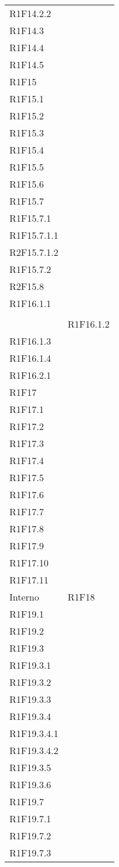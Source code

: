\begin{longtable}{ >{\centering}p{}
			>{\centering}p{}}
	R1F14.2.2\\ 
	R1F14.3\\ 
	R1F14.4\\ 
	R1F14.5\\ 
	R1F15\\ 
	R1F15.1\\ 
	R1F15.2\\ 
	R1F15.3\\ 
	R1F15.4\\ 
	R1F15.5\\ 
	R1F15.6\\ 
	R1F15.7\\ 
	R1F15.7.1\\ 
	R1F15.7.1.1\\ 
	R2F15.7.1.2\\ 
	R1F15.7.2\\ 
	R2F15.8\\ 
	R1F16.1.1 \tabularnewline \rowcolordark &
	\tabularnewline & 
	R1F16.1.2\\
	R1F16.1.3\\ 
	R1F16.1.4\\ 
	R1F16.2.1\\ 
	R1F17\\ 
	R1F17.1\\ 
	R1F17.2\\ 
	R1F17.3\\ 
	R1F17.4\\ 
	R1F17.5\\ 
	R1F17.6\\ 
	R1F17.7\\ 
	R1F17.8\\ 
	R1F17.9\\ 
	R1F17.10\\ 
	R1F17.11 \tabularnewline
	Interno	&	
	R1F18\\ 
	R1F19.1\\ 
	R1F19.2\\ 
	R1F19.3\\ 
	R1F19.3.1\\ 
	R1F19.3.2\\ 
	R1F19.3.3\\ 
	R1F19.3.4\\ 
	R1F19.3.4.1\\ 
	R1F19.3.4.2\\ 
	R1F19.3.5\\ 
	R1F19.3.6\\ 
	R1F19.7\\ 
	R1F19.7.1\\ 
	R1F19.7.2\\ 
	R1F19.7.3\\ 

\end{longtable}
